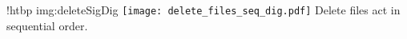 \namedfigure
{!htbp}
{img:deleteSigDig}
{\texttt{[image: delete\_files\_seq\_dig.pdf]}}
{Delete files act in sequential order.}
